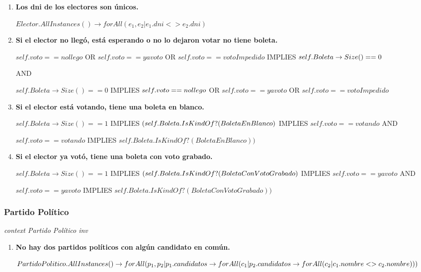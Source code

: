 \begin{enumerate}
\item \textbf{Los dni de los electores son únicos.}

$Elector.AllInstances() \rightarrow forAll(e_1, e_2 | e_1.dni <> e_2.dni)$

\item \textbf{Si el elector no llegó, está esperando o no lo dejaron votar no tiene boleta.}

$self.voto==nollego $ OR $self.voto==yavoto$ OR $self.voto==votoImpedido$ IMPLIES $\\
self.Boleta \rightarrow Size() ==0$

 AND 
 
$self.Boleta \rightarrow Size() ==0$ IMPLIES $\\
self.voto==nollego $ OR $self.voto==yavoto$ OR $self.voto==votoImpedido$

\item \textbf{Si el elector está votando, tiene una boleta en blanco.}

$self.Boleta \rightarrow Size() ==1$ IMPLIES $\\
(self.Boleta.IsKindOf?(BoletaEnBlanco)$ IMPLIES $self.voto==votando$ AND

$self.voto==votando$ IMPLIES $self.Boleta.IsKindOf?(BoletaEnBlanco))$

\item \textbf{Si el elector ya votó, tiene una boleta con voto grabado.}

$self.Boleta \rightarrow Size() ==1$ IMPLIES $\\
(self.Boleta.IsKindOf?(BoletaConVotoGrabado)$ IMPLIES $self.voto==yavoto$ AND

$self.voto==yavoto$ IMPLIES $self.Boleta.IsKindOf?(BoletaConVotoGrabado))$

\end{enumerate}

\subsubsection*{Partido Pol\'itico}

\textit{context Partido Pol\'itico
inv}

\begin{enumerate}
\item \textbf{No hay dos partidos políticos con algún candidato en común.}

$PartidoPolitico.AllInstances() \rightarrow \\
forAll(p_1, p_2 | p_1.candidatos \rightarrow \\
forAll(c_1 | p_2.candidatos \rightarrow \\
forAll(c_2 | c_1.nombre <> c_2.nombre)))$

\end{enumerate}

